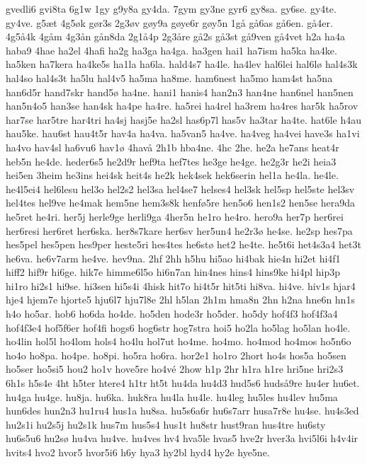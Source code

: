 {gvedli6
gvi8ta
6g1w
1gy
g9y8a
gy4da.
7gym
gy3ne
gyr6
gy8sa.
gy6se.
gy4te.
gy4ve.
g5^^e6t
4g5^^f8k
g^^f8r3s
2g3^^f8v
g^^f8y9a
g^^f8ye6r
g^^f8y5n
1g^^e5
g^^e56as
g^^e56en.
g^^e54er.
4g5^^e54k
4g^^e5m
4g3^^e5n
g^^e5n8da
2g1^^e54p
2g3^^e5re
g^^e52s
g^^e53st
g^^e59ven
g^^e54vet
h2a
ha4a
haba9
4hae
ha2el
4hafi
ha2g
ha3ga
ha4ga.
ha3gen
hai1
ha7ism
ha5ka
ha4ke.
ha5ken
ha7kera
ha4ke5s
ha1la
ha6la.
hald4s7
ha4le.
ha4lev
hal6lei
hal6l^^f8
hal4s3k
hal4so
hal4s3t
ha5lu
hal4v5
ha5ma
ha8me.
ham6nest
ha5mo
ham4st
ha5na
han6d5r
hand7skr
hand5^^f8
ha4ne.
hani1
hanis4
han2n3
han4ne
han6nel
han5nen
han5n4o5
han3se
han4sk
ha4pe
ha4re.
ha5rei
ha4rel
ha3rem
ha4res
har5k
ha5rov
har7se
har5tre
har4tri
ha4sj
hasj5e
ha2sl
has6p7l
has5v
ha3tar
ha4te.
hat6le
h4au
hau5ke.
hau6st
hau4t5r
hav4a
ha4va.
ha5van5
ha4ve.
ha4veg
ha4vei
have3s
ha1vi
ha4vo
hav4sl
ha6vu6
hav1^^f8
4hav^^e5
2h1b
hba4ne.
4hc
2he.
he2a
he7ans
heat4r
heb5n
he4de.
heder6s5
he2d9r
hef9ta
hef7tes
he3ge
he4ge.
he2g3r
he2i
heia3
hei5en
3heim
he3ins
hei4sk
heit4s
he2k
hek4sek
hek6serin
hel1a
he4la.
he4le.
he4l5ei4
hel6lesu
hel3o
hel2s2
hel3sa
hel4se7
helses4
hel3sk
hel5sp
hel5ste
hel3sv
hel4tes
hel9ve
he4mak
hem5ne
hem3s8k
henf^^f85re
hen5o6
hen1s2
hen5se
hera9da
he5ret
he4ri.
her5j
herle9ge
herli9ga
4her5n
he1ro
he4ro.
hero9a
her7p
her6rei
her6resi
her6ret
her6ska.
her8s7kare
her6sv
her5un4
he2r3^^f8
he4se.
he2sp
hes7pa
hes5pel
hes5pen
hes9per
heste5ri
hes4tes
he6st^^f8
het2
he4te.
he5t6i
het4s3a4
het3t
he6va.
he6v7arm
he4ve.
hev9na.
2hf
2hh
h5hu
hi5ao
hi4bak
hie4n
hi2et
hi4f1
hiff2
hif9r
hi6ge.
hik7e
himme6l5o
hi6n7an
hin4nes
hins4
hins9ke
hi4pl
hip3p
hi1ro
hi2s1
hi9se.
hi3sen
hi5s4i
4hisk
hit7o
hi4t5r
hit5ti
hi8va.
hi4ve.
hiv1s
hjar4
hje4
hjem7e
hjorte5
hju6l7
hju7l8e
2hl
h5lan
2h1m
hma8n
2hn
h2na
hne6n
hn1s
h4o
ho5ar.
hob6
ho6da
ho4de.
ho5den
hode3r
ho5der.
ho5dy
hof4f3
hof4f3a4
hof4f3e4
hof5f6er
hof4fi
hogs6
hog6str
hog7stra
hoi5
ho2la
ho5lag
ho5lan
ho4le.
ho4lin
hol5l
ho4lom
hols4
ho4lu
hol7ut
ho4me.
ho4mo.
ho4mod
ho4mos
ho5n6o
ho4o
ho8pa.
ho4pe.
ho8pi.
ho5ra
ho6ra.
hor2e1
ho1ro
2hort
ho4s
hos5a
ho5sen
ho5ser
ho5si5
hou2
ho1v
hove5re
ho4v^^e9
2how
h1p
2hr
h1ra
h1re
hri5ne
hri2s3
6h1s
h5s4e
4ht
h5ter
htere4
h1tr
ht5t
hu4da
hu4d3
hud5s6
huds^^e59re
hu4er
hu6et.
hu4ga
hu4ge.
hu8ja.
hu6ka.
huk8ra
hu4la
hu4le.
hu4leg
hu5les
hu4lev
hu5ma
hun6des
hun2n3
hu1ru4
hus1a
hu8sa.
hu5s6a6r
hu6s7arr
husa7r8e
hu4se.
hu4s3ed
hu2s1i
hu2s5j
hu2s1k
hus7m
hus5s4
hus1t
hu8str
hust9ran
hus4tre
hu6sty
hu6s5u6
hu2s^^f8
hu4va
hu4ve.
hu4ves
hv4
hva5le
hvas5
hve2r
hver3a
hvi5l6i
h4v4ir
hvits4
hvo2
hvor5
hvor5i6
h6y
hya3
hy2bl
hyd4
hy2e
hye5ne.
}
